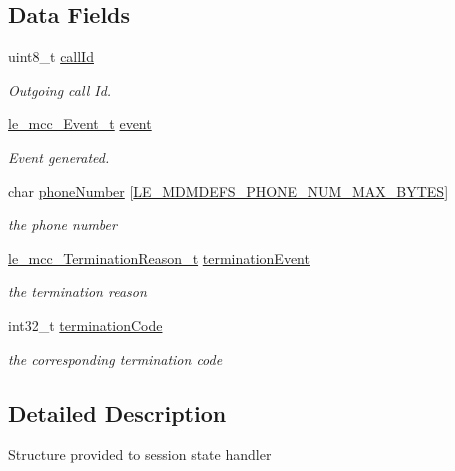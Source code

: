 \subsection*{Data Fields}
\begin{DoxyCompactItemize}
\item 
uint8\+\_\+t \hyperlink{structpa__mcc___call_event_data__t_a88613e6f82b16ff79d1aa7f2682e064b}{call\+Id}
\begin{DoxyCompactList}\small\item\em Outgoing call Id. \end{DoxyCompactList}\item 
\hyperlink{le__mcc__interface_8h_aefc4679ffa76d0e04c578572c22f06cf}{le\+\_\+mcc\+\_\+\+Event\+\_\+t} \hyperlink{structpa__mcc___call_event_data__t_a63c1fc87197094a915fd720803a99048}{event}
\begin{DoxyCompactList}\small\item\em Event generated. \end{DoxyCompactList}\item 
char \hyperlink{structpa__mcc___call_event_data__t_a055dcf52e34d1192aa8bcd77dc7460b9}{phone\+Number} \mbox{[}\hyperlink{le__mdm_defs__interface_8h_ae6d4a4c7892f14d1e340f8df083d479f}{L\+E\+\_\+\+M\+D\+M\+D\+E\+F\+S\+\_\+\+P\+H\+O\+N\+E\+\_\+\+N\+U\+M\+\_\+\+M\+A\+X\+\_\+\+B\+Y\+T\+ES}\mbox{]}
\begin{DoxyCompactList}\small\item\em the phone number \end{DoxyCompactList}\item 
\hyperlink{le__mcc__interface_8h_abda706f723ba619f9bc460bcc9a4960d}{le\+\_\+mcc\+\_\+\+Termination\+Reason\+\_\+t} \hyperlink{structpa__mcc___call_event_data__t_a759fc09739f7091988eb9951a0f8d1aa}{termination\+Event}
\begin{DoxyCompactList}\small\item\em the termination reason \end{DoxyCompactList}\item 
int32\+\_\+t \hyperlink{structpa__mcc___call_event_data__t_a0cac0a4b1a80aacb3e56f9d6730be7b5}{termination\+Code}
\begin{DoxyCompactList}\small\item\em the corresponding termination code \end{DoxyCompactList}\end{DoxyCompactItemize}


\subsection{Detailed Description}
Structure provided to session state handler 


